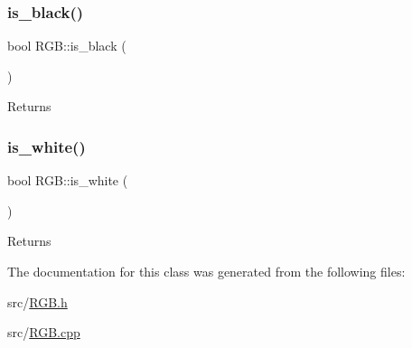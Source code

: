 \subsubsection{\texorpdfstring{is\+\_\+black()}{is\_black()}}
{\footnotesize\ttfamily bool R\+G\+B\+::is\+\_\+black (\begin{DoxyParamCaption}{ }\end{DoxyParamCaption})}

\begin{DoxyReturn}{Returns}

\end{DoxyReturn}
\mbox{\label{class_r_g_b_aa8289d37cc58a81e02b857fb91bfca5c}} 
\subsubsection{\texorpdfstring{is\+\_\+white()}{is\_white()}}
{\footnotesize\ttfamily bool R\+G\+B\+::is\+\_\+white (\begin{DoxyParamCaption}{ }\end{DoxyParamCaption})}

\begin{DoxyReturn}{Returns}

\end{DoxyReturn}


The documentation for this class was generated from the following files\+:\begin{DoxyCompactItemize}
\item 
src/\mbox{\hyperlink{_r_g_b_8h}{R\+G\+B.\+h}}\item 
src/\mbox{\hyperlink{_r_g_b_8cpp}{R\+G\+B.\+cpp}}\end{DoxyCompactItemize}

